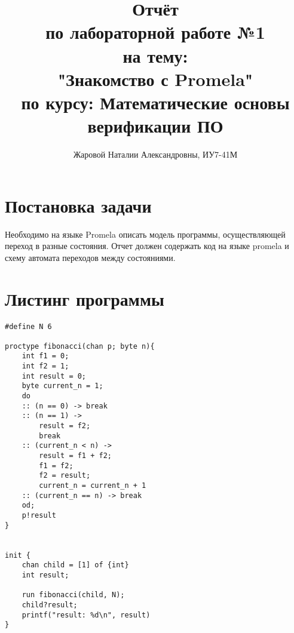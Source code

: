 \documentclass[a4paper,12pt]{report}
\title{Отчёт \\ по лабораторной работе №1 \\ на тему: \\ "Знакомство с Promela" \\ по курсу: Математические основы верификации ПО}
\author{Жаровой Наталии Александровны, ИУ7-41М\\}
\begin{document}
\maketitle

\section*{Постановка задачи}

Необходимо на языке Promela описать модель программы, осуществляющей переход 
в разные состояния. Отчет должен содержать код на языке promela и схему 
автомата переходов между состояниями.

\section*{Листинг программы}
\begin{Verbatim}
#define N 6

proctype fibonacci(chan p; byte n){
    int f1 = 0;
    int f2 = 1;
    int result = 0;
    byte current_n = 1;
    do
    :: (n == 0) -> break
    :: (n == 1) ->
        result = f2;
        break 
    :: (current_n < n) ->
        result = f1 + f2;
        f1 = f2;
        f2 = result;
        current_n = current_n + 1
    :: (current_n == n) -> break
    od;
    p!result
}


init {
    chan child = [1] of {int}
    int result;

    run fibonacci(child, N);
    child?result;
    printf("result: %d\n", result)
}

\end{Verbatim}
\end{document}
